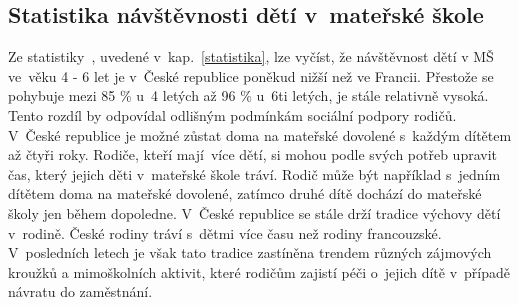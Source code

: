 			\subsection{Statistika návštěvnosti dětí v mateřské škole}
		
				Ze statistiky~\cite{Eurydice}, uvedené v kap.~\ref{statistika}, lze vyčíst, že návštěvnost dětí v MŠ ve věku 4 - 6 let je v~České republice poněkud nižší než ve Francii. Přestože se pohybuje mezi 85 \% u~4 letých až 96 \% u~6ti letých, je stále relativně vysoká. Tento rozdíl by odpovídal odlišným podmínkám sociální podpory rodičů. V České republice je možné zůstat doma na mateřské dovolené s každým dítětem až čtyři roky. Rodiče, kteří mají více dětí, si mohou podle svých potřeb upravit čas, který jejich děti v mateřské škole tráví. Rodič může být například s~jedním dítětem doma na mateřské dovolené, zatímco druhé dítě dochází do mateřské školy jen během dopoledne. V České republice se stále drží tradice výchovy dětí v rodině. České rodiny tráví s~dětmi více času než rodiny francouzské. V posledních letech je však tato tradice zastíněna trendem různých zájmových kroužků a mimoškolních aktivit, které rodičům zajistí péči o~jejich dítě v~případě návratu do zaměstnání.  


				
	


